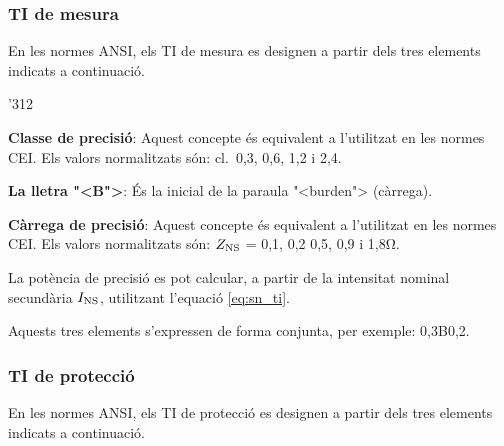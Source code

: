 \subsubsection{TI de mesura}

En les normes \textsf{ANSI}, els TI de mesura  es designen a partir
dels tres elements indicats a continuaci\'{o}.

\begin{dingautolist}{'312}
    \item \textbf{Classe de precisi\'{o}}: Aquest concepte \'{e}s equivalent
    a l'utilitzat en les normes \textsf{CEI}. Els valors
    normalitzats s\'{o}n: cl.~0,3, 0,6, 1,2 i 2,4.
    \item \textbf{La lletra {"<}B{">}}: \'{E}s la inicial de la paraula
    {"<}burden{">}  (c\`{a}rrega).
    \item \textbf{C\`{a}rrega de precisi\'{o}}: Aquest concepte \'{e}s equivalent
    a l'utilitzat en les normes \textsf{CEI}. Els valors
    normalitzats s\'{o}n: $Z_\mathrm{NS}$ = 0,1, 0,2 0,5, 0,9 i 1,8\unit{\ohm}.

    La pot\`{e}ncia de precisi\'{o} es pot calcular, a partir de la
    intensitat nominal secund\`{a}ria $I_\mathrm{NS}$, utilitzant l'equaci\'{o}
    \eqref{eq:sn_ti}.
\end{dingautolist}

Aquests tres elements s'expressen de forma conjunta, per exemple:
0,3B0,2.

\subsubsection{TI de protecci\'{o}}

En les normes \textsf{ANSI}, els TI de protecci\'{o} es designen a
partir dels tres elements indicats a continuaci\'{o}.

